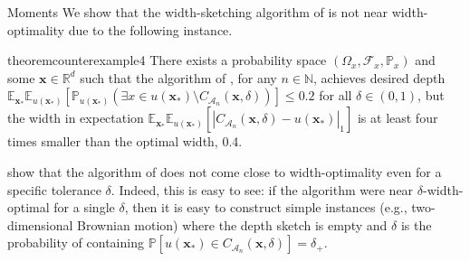 \begin{assumptioni}[i.i.d data]
\begin{assumptioni}
\begin{assumptioni}{Moments}
We show that the width-sketching algorithm of \cite{angelopoulos2024conformal} is not near width-optimality due to the following instance.
\begin{restatable}{theorem}{counterexample4}\label{prop:counterexample4}
  There exists a probability space $(\Omega_x, \mathcal{F}_x,\mathbb{P}_x)$ and some $\bm{x} \in \mathbb{R}^d$ such that the algorithm of \cite{angelopoulos2024conformal}, for any $n \in \mathbb{N}$, achieves desired depth $\mathbb{E}_{\bm{x}_*} \mathbb{E}_{u(\bm{x_*})}[\mathbb{P}_{u(\bm{x_*})}(\exists x \in u(\bm{x_*}) \setminus C_{\mathcal{A}_n}(\bm{x},\delta))]  \leq 0.2$ for all $\delta \in (0,1)$, but the width in expectation $\mathbb{E}_{\bm{x}_*} \mathbb{E}_{u(\bm{x_*})}[|C_{\mathcal{A}_n}(\bm{x},\delta) - u(\bm{x_*})|_1]$ is at least four times smaller than the optimal width, 0.4.

\begin{remark}
   show that the algorithm of \cite{angelopoulos2024conformal} does not come close to width-optimality even for a specific tolerance $\delta$. Indeed, this is easy to see: if the algorithm were near $\delta$-width-optimal for a single $\delta$, then it is easy to construct simple instances (e.g., two-dimensional Brownian motion) where the depth sketch is empty and $\delta$ is the probability of containing $\mathbb{P}[u(\bm{x_*}) \in C_{\mathcal{A}_n}(\bm{x},\delta)]=\delta_{+}$.  
\end{remark}


\end{restatable}
\end{assumptioni}
\end{assumptioni}
\end{assumptioni}
